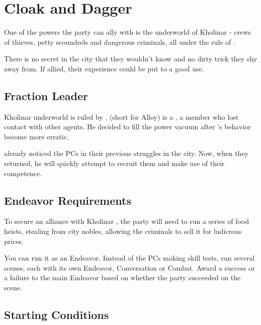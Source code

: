 \section{Cloak and Dagger}
\label{sec:cloakAndDagger}

One of the powers the party can ally with is the underworld of Kholinar - crews of thieves, petty scoundrels and dangerous criminals, all under the rule of \npcGhostbloodBoss{}.

There is no secret in the city that they wouldn't know and no dirty trick they shy away from. If allied, their experience could be put to a good use.




\subsection{Fraction Leader}

Kholinar underworld is ruled by \npcGhostbloodBoss[s]{}. \npcGhostbloodBoss{} (short for Alloy) is a \enemyGhostbloodBoss{}, a \npcFractionGhostbloods{} member who lost contact with other agents. He decided to fill the power vacuum after \npcQueen{}'s behavior become more erratic. 

\npcGhostbloodBoss{} already noticed the PCs in their previous struggles in the city. Now, when they returned, he will quickly attempt to recruit them and make use of their competence.



\subsection{Endeavor Requirements}

To secure an alliance with Kholinar \npcFractionGhostbloods{}, the party will need to run a series of food heists, stealing from city nobles, allowing the criminals to sell it for ludicrous prices.

You can run it as an Endeavor. Instead of the PCs making skill tests, run several scenes, each with its own Endeavor, Conversation or Combat. Award a success or a failure to the main Endeavor based on whether the party succeeded on the scene.




\subsection{Starting Conditions}

